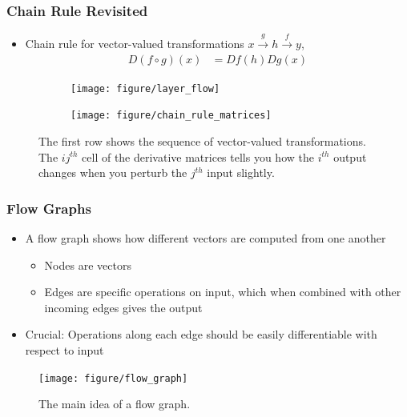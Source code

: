 \documentclass[10pt,mathserif]{beamer}
\begin{document}
\begin{frame}
  \frametitle{Chain Rule Revisited}
  \begin{itemize}
  \item Chain rule for vector-valued transformations $x \xrightarrow{g} h
    \xrightarrow{f} y$,
    \begin{align*}
      D\left(f \circ g\right)\left(x\right) &= Df\left(h\right)Dg\left(x\right)
    \end{align*}
  \end{itemize}
  \begin{figure}[ht]
    \centering
    \begin{subfigure}{0.2\paperwidth}
      \texttt{[image: figure/layer\_flow]}
    \end{subfigure}
    \begin{subfigure}{0.7\paperwidth}
      \texttt{[image: figure/chain\_rule\_matrices]}
    \end{subfigure}
    \caption{The first row shows the sequence of vector-valued transformations.
      The $ij^{th}$ cell of the derivative matrices tells you how the $i^{th}$
      output changes when you perturb the $j^{th}$ input
      slightly. \label{fig:chain_rule_matrices} }
  \end{figure}
\end{frame}

\begin{frame}
  \frametitle{Flow Graphs}
  \begin{itemize}
  \item A flow graph shows how different vectors are computed from one another
    \begin{itemize}
    \item Nodes are vectors
    \item Edges are specific operations on input, which when combined with other
      incoming edges gives the output
    \end{itemize}
  \item Crucial: Operations along each edge should be easily differentiable with
    respect to input
  \end{itemize}
\begin{figure}[ht]
  \centering
  \texttt{[image: figure/flow\_graph]}
  \caption{The main idea of a flow graph. \label{fig:flow_graph} }
\end{figure}
\end{frame}
\end{document}
